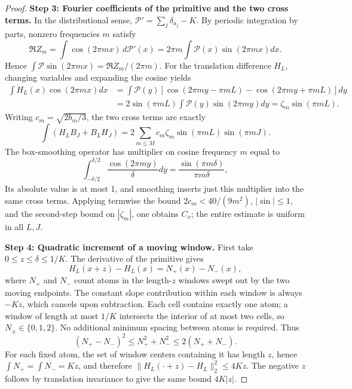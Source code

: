 \documentclass[a4paper,11pt]{article}
\theoremstyle{remark}
\begin{document}
\begin{proof}
\textbf{Step 3: Fourier coefficients of the primitive and the two cross terms.}
In the distributional sense, $\mathcal P' = \sum_j \delta_{a_j} - K$.
By periodic integration by parts, nonzero frequencies $m$ satisfy
\[
 \Re Z_m=\int\cos(2\pi mx)\,d\mathcal P'(x)
 =2\pi m\int\mathcal P(x)\sin(2\pi mx)dx.
\]
Hence $\int\mathcal P\sin(2\pi mx)=\Re Z_m/(2\pi m)$.
For the translation difference $H_L$, changing variables and expanding the cosine yields
\begin{align*}
 \int H_L(x)\cos(2\pi mx)dx
 &=\int\mathcal P(y)[\cos(2\pi my-\pi mL)
 -\cos(2\pi my+\pi mL)]dy\\
 &=2\sin(\pi mL)\int\mathcal P(y)\sin(2\pi my)dy
 =\zeta_m\sin(\pi mL).
\end{align*}
Writing $c_m=\sqrt{2b_m/3}$, the two cross terms are exactly
\[
 \int(H_LB_J+B_LH_J)
 =2\sum_{m\le M}c_m\zeta_m\sin(\pi mL)\sin(\pi mJ).
\]
The box-smoothing operator has multiplier on cosine frequency $m$ equal to
\[
 \int_{-\delta/2}^{\delta/2}\frac{\cos(2\pi my)}\delta dy
 =\frac{\sin(\pi m\delta)}{\pi m\delta},
\]
Its absolute value is at most 1, and smoothing inserts just this multiplier into the same cross terms.
Applying termwise the bound $2c_m<40/(9m^2)$, $|\sin|\le1$, and the second-step bound on $|\zeta_m|$,
one obtains $C_x$; the entire estimate is uniform in all $L,J$.

\textbf{Step 4: Quadratic increment of a moving window.}
First take $0\le z\le\delta\le1/K$. The derivative of the primitive gives
\[
 H_L(x+z)-H_L(x)=N_+(x)-N_-(x),
\]
where $N_+$ and $N_-$ count atoms in the length-$z$ windows swept out by the two moving endpoints.
The constant slope contribution within each window is always $-Kz$, which cancels upon subtraction.
Each cell contains exactly one atom; a window of length at most $1/K$ intersects the interior of at most two cells,
so $N_\pm\in\{0,1,2\}$. No additional minimum spacing between atoms is required.
Thus
\[
 (N_+-N_-)^2\le N_+^2+N_-^2\le2(N_++N_-).
\]
For each fixed atom, the set of window centers containing it has length $z$, hence
$\int N_+=\int N_-=Kz$, and therefore
$\|H_L(\cdot+z)-H_L\|_2^2\le4Kz$.
The negative $z$ follows by translation invariance to give the same bound $4K|z|$.


\end{proof}
\end{document}
